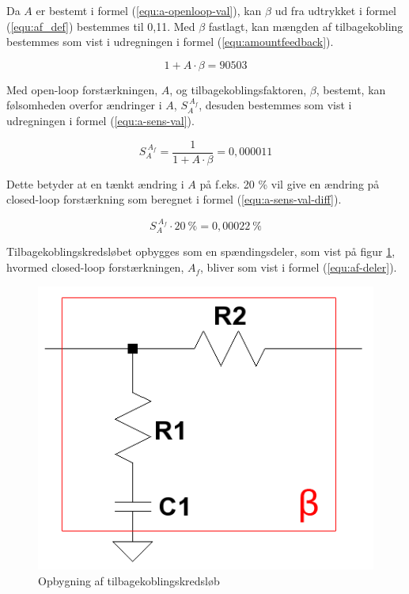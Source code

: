 Da $A$ er bestemt i formel (\ref{equ:a-openloop-val}), kan $\beta$ ud fra udtrykket i formel (\ref{equ:af_def}) bestemmes til 0,11. Med $\beta$ fastlagt, kan mængden af tilbagekobling bestemmes som vist i udregningen i formel (\ref{equ:amountfeedback}).

\begin{equation}
\label{equ:amountfeedback}
1 + A \cdot \beta = 90503
\end{equation}

Med open-loop forstærkningen, $A$, og tilbagekoblingsfaktoren, $\beta$, bestemt, kan følsomheden overfor ændringer i $A$, $S_A^{~A_f}$, desuden bestemmes som vist i udregningen i formel (\ref{equ:a-sens-val}).

\begin{equation}
\label{equ:a-sens-val}
S_A^{~A_f} = \frac{1}{1 + A \cdot \beta} = 0,000011
\end{equation}

Dette betyder at en tænkt ændring i $A$ på f.eks. 20 \% vil give en ændring på closed-loop forstærkning som beregnet i formel (\ref{equ:a-sens-val-diff}).

\begin{equation}
\label{equ:a-sens-val-diff}
S_A^{~A_f} \cdot 20~\% = 0,00022~\%
\end{equation}

Tilbagekoblingskredsløbet opbygges som en spændingsdeler, som vist på figur \ref{fig:beta-clean}, hvormed closed-loop forstærkningen, $A_f$, bliver som vist i formel (\ref{equ:af-deler}).

\begin{figure}[h]
\centering
\includegraphics[scale=0.3]{teknisk/effektforstaerker/beta-clean.png}
\caption{Opbygning af tilbagekoblingskredsløb}
\label{fig:beta-clean}
\end{figure} 

